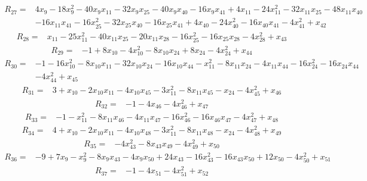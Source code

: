 \begin{align*}
R_{27}={}&4x_{9}-18x_{9}^{2}-40x_{9}x_{11}-32x_{9}x_{25}-40x_{9}x_{40}-16x_{9}x_{41}+4x_{11}-24x_{11}^{2}-32x_{11}x_{25}-48x_{11}x_{40}\\
{}&-16x_{11}x_{41}-16x_{25}^{2}-32x_{25}x_{40}-16x_{25}x_{41}+4x_{40}-24x_{40}^{2}-16x_{40}x_{41}-4x_{41}^{2}+x_{42}
\end{align*}
\begin{align*}
R_{28}={}&x_{11}-25x_{11}^{2}-40x_{11}x_{25}-20x_{11}x_{28}-16x_{25}^{2}-16x_{25}x_{28}-4x_{28}^{2}+x_{43}
\end{align*}
\begin{align*}
R_{29}={}&-1+8x_{10}-4x_{10}^{2}-8x_{10}x_{24}+8x_{24}-4x_{24}^{2}+x_{44}
\end{align*}
\begin{align*}
R_{30}={}&-1-16x_{10}^{2}-8x_{10}x_{11}-32x_{10}x_{24}-16x_{10}x_{44}-x_{11}^{2}-8x_{11}x_{24}-4x_{11}x_{44}-16x_{24}^{2}-16x_{24}x_{44}\\
{}&-4x_{44}^{2}+x_{45}
\end{align*}
\begin{align*}
R_{31}={}&3+x_{10}-2x_{10}x_{11}-4x_{10}x_{45}-3x_{11}^{2}-8x_{11}x_{45}-x_{24}-4x_{45}^{2}+x_{46}
\end{align*}
\begin{align*}
R_{32}={}&-1-4x_{46}-4x_{46}^{2}+x_{47}
\end{align*}
\begin{align*}
R_{33}={}&-1-x_{11}^{2}-8x_{11}x_{46}-4x_{11}x_{47}-16x_{46}^{2}-16x_{46}x_{47}-4x_{47}^{2}+x_{48}
\end{align*}
\begin{align*}
R_{34}={}&4+x_{10}-2x_{10}x_{11}-4x_{10}x_{48}-3x_{11}^{2}-8x_{11}x_{48}-x_{24}-4x_{48}^{2}+x_{49}
\end{align*}
\begin{align*}
R_{35}={}&-4x_{43}^{2}-8x_{43}x_{49}-4x_{49}^{2}+x_{50}
\end{align*}
\begin{align*}
R_{36}={}&-9+7x_{9}-x_{9}^{2}-8x_{9}x_{43}-4x_{9}x_{50}+24x_{43}-16x_{43}^{2}-16x_{43}x_{50}+12x_{50}-4x_{50}^{2}+x_{51}
\end{align*}
\begin{align*}
R_{37}={}&-1-4x_{51}-4x_{51}^{2}+x_{52}
\end{align*}
